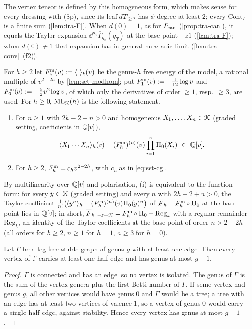 The vertex tensor is defined by this homogeneous form, which makes sense for every dressing with (Sp), since its leaf $dT_{\geq 2}$ has $\psi$-degree at least $2$; every $\mathrm{Cont}_\Gamma$ is a finite sum (\cref{lem:tra-F}). When $d(0) = 1$, as for $P_{\mathrm{can}}$ (\cref{prop:tra-can}), it equals the Taylor expansion $\dd^{n_v}\overline F_{g_v}(q_T)$ at the base point $-z1$ (\cref{lem:tra-F}); when $d(0)\neq 1$ that expansion has in general no $u$-adic limit (\cref{lem:tra-conv}~(f2)).

\begin{defn}
\label{def:red-ML}
For $h\geq 2$ let $F^{\mathrm{m}}_h(v) := \langle\ \rangle_h(v)$ be the genus-$h$ free energy of the model, a rational multiple of $v^{2-2h}$ by \cref{lem:set-modhom}; put $F^{\mathrm{m}}_1(v) := -\frac{1}{12}\log v$ and $F^{\mathrm{m}}_0(v) := -\frac52v^2\log v$, of which only the derivatives of order $\geq 1$, resp.\ $\geq 3$, are used. For $h\geq 0$, $\mathrm{ML}_{\mathcal{K}}(h)$ is the following statement.
\begin{enumerate}
\item For $n\geq 1$ with $2h-2+n>0$ and homogeneous $X_1,\dots,X_n\in\mathcal{K}$ (graded setting, coefficients in $\mathbb{Q}[v]$),
\[
\langle X_1\cdots X_n\rangle_h(v)-(F^{\mathrm{m}}_h)^{(n)}(v)\prod_{i=1}^n\Pi_0(X_i)\ \in\ \mathbb{Q}[v] .
\]
\item For $h\geq 2$, $F^{\mathrm{m}}_h = c_hv^{2-2h}$, with $c_h$ as in \eqref{eq:set-cg}.
\end{enumerate}
By multilinearity over $\mathbb{Q}[v]$ and polarisation, (i) is equivalent to the function form: for every $y\in\mathcal{K}$ (graded setting) and every $n$ with $2h-2+n>0$, the Taylor coefficient $\frac1{n!}\bigl(\langle y^n\rangle_h-(F^{\mathrm{m}}_h)^{(n)}(v)\Pi_0(y)^n\bigr)$ of $\overline F_h-F^{\mathrm{m}}_h\circ\Pi_0$ at the base point lies in $\mathbb{Q}[v]$; in short, $\overline F_h|_{-z+\mathcal{K}} = F^{\mathrm{m}}_h\circ\Pi_0+\mathrm{Reg}_h$ with a regular remainder $\mathrm{Reg}_h$, an identity of the Taylor coefficients at the base point of order $n>2-2h$ (all orders for $h\geq2$, $n\geq1$ for $h=1$, $n\geq3$ for $h=0$).
\end{defn}

\begin{lem}
\label{lem:red-genus}
Let $\Gamma$ be a leg-free stable graph of genus $g$ with at least one edge. Then every vertex of $\Gamma$ carries at least one half-edge and has genus at most $g-1$.
\end{lem}

\begin{proof}
$\Gamma$ is connected and has an edge, so no vertex is isolated. The genus of $\Gamma$ is the sum of the vertex genera plus the first Betti number of $\Gamma$. If some vertex had genus $g$, all other vertices would have genus $0$ and $\Gamma$ would be a tree; a tree with an edge has at least two vertices of valence $1$, so a vertex of genus $0$ would carry a single half-edge, against stability. Hence every vertex has genus at most $g-1$.
\end{proof}


